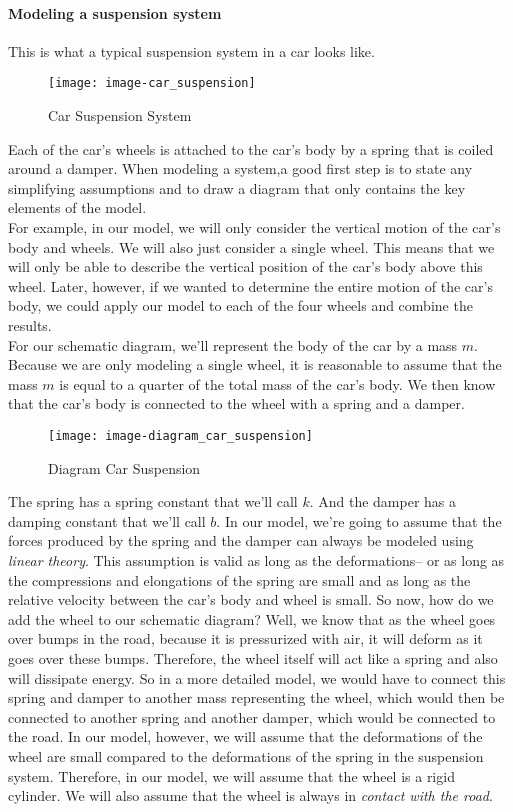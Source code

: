 \paragraph{Modeling a suspension system}
This is what a typical suspension system in a car looks like.
\begin{figure}[ht!]
  \centering
  \texttt{[image: image-car\_suspension]}
  \caption{Car Suspension System}
\end{figure}

Each of the car's wheels is attached to the car's body
by a spring that is coiled around a damper.
When modeling a system,a good first step is to state any simplifying assumptions
and to draw a diagram that only contains the key elements of the model.\\
For example, in our model, we will only
consider the vertical motion of the car's body and wheels.
We will also just consider a single wheel.
This means that we will only be able to describe
the vertical position of the car's body above this wheel.
Later, however, if we wanted to determine the entire motion
of the car's body, we could apply our model
to each of the four wheels and combine the results.\\

For our schematic diagram, we'll represent the body of the car
by a mass $m$. Because we are only modeling a single wheel,
it is reasonable to assume that the mass $m$ is equal to a quarter of
the total mass of the car's body.
We then know that the car's body is
connected to the wheel with a spring and a damper.

\begin{figure}[ht!]
  \centering
  \texttt{[image: image-diagram\_car\_suspension]}
  \caption{Diagram Car Suspension}
\end{figure}

The spring has a spring constant that we'll call $k$.
And the damper has a damping constant that we'll call $b$.
In our model, we're going to assume that the forces produced
by the spring and the damper can always
be modeled using \emph{linear theory}.
This assumption is valid as long as the deformations--
or as long as the compressions and elongations of the spring
are small and as long as the relative velocity
between the car's body and wheel is small.
So now, how do we add the wheel to our schematic diagram?
Well, we know that as the wheel goes over bumps in the road,
because it is pressurized with air,
it will deform as it goes over these bumps.
Therefore, the wheel itself will act like a spring and also
will dissipate energy.
So in a more detailed model, we would have to connect this spring and damper
to another mass representing the wheel, which would then
be connected to another spring and another damper, which
would be connected to the road.
In our model, however, we will assume
that the deformations of the wheel are small compared to the deformations of the spring
in the suspension system.
Therefore, in our model, we will assume that the wheel is a rigid cylinder.
We will also assume that the wheel is always
in \emph{contact with the road}.\\

